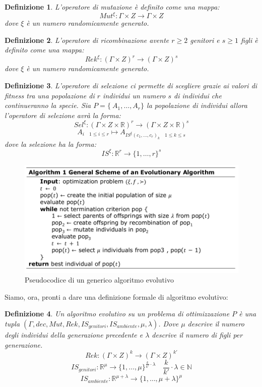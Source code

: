 \documentclass[10pt,a4paper]{article}
\newtheorem{definition}{Definizione}
\begin{document}
\begin{definition}
L'operatore di \emph{mutazione} è definito come una mappa:
$$
Mut^{\xi} : \Gamma \times Z \to \Gamma \times Z
$$
dove $\xi$ è un numero randomicamente generato.
\end{definition}

\begin{definition}
L'operatore di \emph{ricombinazione} avente $r \geq 2$ genitori e $s \geq 1$ figli è definito come una mappa:
$$
Rek^\xi : (\Gamma \times Z)^r \to (\Gamma \times Z)^s
$$
dove $\xi$ è un numero randomicamente generato.
\end{definition}

\begin{definition}
L'operatore di \emph{selezione} ci permette di scegliere grazie ai valori di fitness tra una popolazione di $r$ individui un numero $s$ di individui che continueranno la specie. Sia $P = \{\ A_1, \dots, A_r \} $ la popolazione di individui allora l'operatore di selezione avrà la forma:
$$
Sel^\xi : (\Gamma \times Z \times \mathbb{R})^r \to (\Gamma \times Z \times \mathbb{R})^s
$$
$$
A_{i \quad 1 \leq i \leq r} \mapsto A_{IS^\xi (c_1,\dots,c_r)_k \quad 1 \leq k \leq s } 
$$
dove la selezione ha la forma:
$$
IS^\xi : \mathbb{R}^r \to \{ 1, \dots, r \}^s
$$
\end{definition}


\begin{figure}
\centering
\includegraphics[scale=0.3]{img/evalg.png}
\caption{Pseudocodice di un generico algoritmo evolutivo}
\label{fig:36}
\end{figure}

Siamo, ora, pronti a dare una definizione formale di algoritmo evolutivo:

\begin{definition}
Un \emph{algoritmo evolutivo} su un problema di ottimizzazione $P$ è una tupla $(\Gamma, dec, Mut, Rek, IS_{genitori}, IS_{ambiente}, \mu, \lambda)$. Dove $\mu$ descrive il numero degli individui della generazione precedente e $\lambda$ descrive il numero di figli per generazione.
$$
Rek : (\Gamma \times Z)^k \to (\Gamma \times Z)^{k'}
$$
$$
IS_{genitori} : \mathbb{R}^\mu \to \{ 1, \dots, \mu \}^{\frac{k}{k'}\cdot \lambda} \quad \frac{k}{k'}\cdot \lambda \in \mathbb{N}
$$
$$
IS_{ambiente} : \mathbb{R}^{\mu + \lambda} \to \{ 1, \dots, \mu + \lambda \}^\mu
$$
\end{definition}
\end{document}
